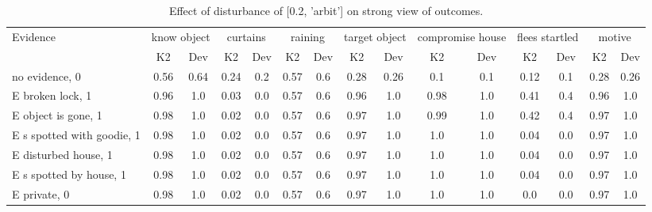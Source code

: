 \begin{table}\begin{tabular}{l|cc|cc|cc|cc|cc|cc|cc}\toprule\multirow{2}{*}{Evidence} & \multicolumn{2}{c}{know object}& \multicolumn{2}{c}{curtains}& \multicolumn{2}{c}{raining}& \multicolumn{2}{c}{target object}& \multicolumn{2}{c}{compromise house}& \multicolumn{2}{c}{flees startled}& \multicolumn{2}{c}{motive}\\& {K2} & {Dev}& {K2} & {Dev}& {K2} & {Dev}& {K2} & {Dev}& {K2} & {Dev}& {K2} & {Dev}& {K2} & {Dev}\\\midrule
no evidence, 0 & \cellcolor{Bittersweet}0.56&\cellcolor{Bittersweet}0.64&0.24&0.2&0.57&0.6&0.28&0.26&0.1&0.1&0.12&0.1&0.28&0.26\\E broken lock, 1 & 0.96&1.0&0.03&0.0&0.57&0.6&0.96&1.0&0.98&1.0&0.41&0.4&0.96&1.0\\E object is gone, 1 & 0.98&1.0&0.02&0.0&0.57&0.6&0.97&1.0&0.99&1.0&0.42&0.4&0.97&1.0\\E s spotted with goodie, 1 & 0.98&1.0&0.02&0.0&0.57&0.6&0.97&1.0&1.0&1.0&0.04&0.0&0.97&1.0\\E disturbed house, 1 & 0.98&1.0&0.02&0.0&0.57&0.6&0.97&1.0&1.0&1.0&0.04&0.0&0.97&1.0\\E s spotted by house, 1 & 0.98&1.0&0.02&0.0&0.57&0.6&0.97&1.0&1.0&1.0&0.04&0.0&0.97&1.0\\E private, 0 & 0.98&1.0&0.02&0.0&0.57&0.6&0.97&1.0&1.0&1.0&0.0&0.0&0.97&1.0\\\bottomrule\end{tabular}\caption{Effect of disturbance of [0.2, 'arbit'] on strong view of outcomes.}\end{table}